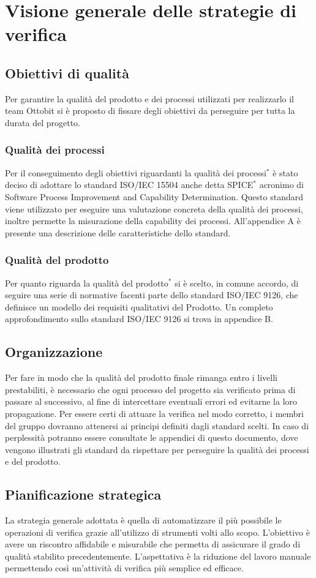 \section{Visione generale delle strategie di verifica}
\subsection{Obiettivi di qualità}
	Per garantire la qualità del prodotto e dei processi utilizzati per realizzarlo il team Ottobit si è proposto di fissare degli obiettivi da perseguire per tutta la durata del progetto.
	\subsubsection{Qualità dei processi}
	Per il conseguimento degli obiettivi riguardanti la qualità dei processi$^*$ è stato deciso di adottare lo standard ISO/IEC 15504 anche detta SPICE$^*$ acronimo di Software Process Improvement and Capability Determination. Questo standard viene utilizzato per eseguire una valutazione concreta della qualità dei processi, inoltre permette la misurazione della capability dei processi. All'appendice A è presente una descrizione delle caratteristiche dello standard.
	\subsubsection{Qualità del prodotto}
		Per quanto riguarda la qualità del prodotto$^*$ si è scelto, in comune accordo, di seguire una serie di normative facenti parte dello standard ISO/IEC 9126, che definisce un modello dei requisiti qualitativi del Prodotto. Un completo approfondimento sullo standard ISO/IEC 9126 si trova in appendice B.
\subsection{Organizzazione}
Per fare in modo che la qualità del prodotto finale rimanga entro i livelli prestabiliti, è necessario che ogni processo del progetto sia verificato prima di passare al successivo, al fine di intercettare eventuali errori ed evitarne la loro propagazione. Per essere certi di attuare la verifica nel modo corretto, i membri del gruppo dovranno attenersi ai principi definiti dagli standard scelti. In caso di perplessità potranno essere consultate le appendici di questo documento, dove vengono illustrati gli standard da rispettare per perseguire la qualità dei processi e del prodotto.

\subsection{Pianificazione strategica}
La strategia generale adottata è quella di automatizzare il più possibile le operazioni di verifica grazie all'utilizzo di strumenti volti allo scopo. L'obiettivo è avere un riscontro affidabile e misurabile che permetta di assicurare il grado di qualità stabilito precedentemente.  L'aspettativa è la riduzione del lavoro manuale permettendo così un'attività di verifica più semplice ed efficace.

